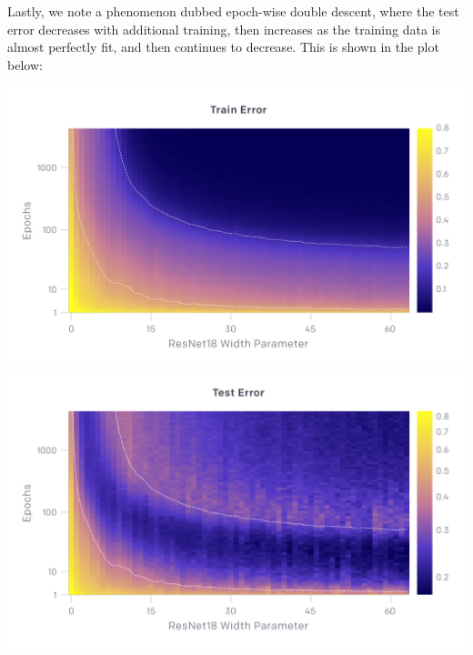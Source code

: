 Lastly, we note a phenomenon dubbed epoch-wise double descent, where the test error decreases with additional training, then increases as the training data is almost perfectly fit, and then continues to decrease. This is shown in the plot below:
\begin{center}
    \includegraphics[scale=0.1]{double-descent/epoch_train.png}
    \includegraphics[scale=0.1]{double-descent/dd1.png}
\end{center}

\begin{enumerate}
    
    

    
    

    
    

\end{enumerate}
